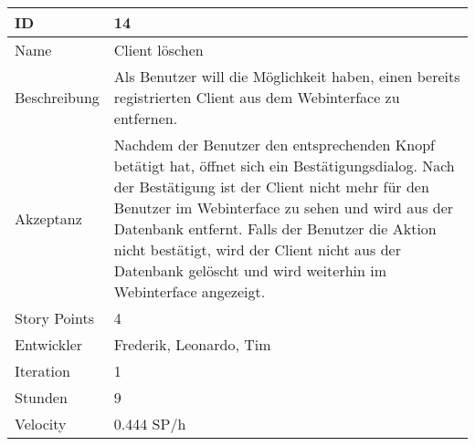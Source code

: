 \begin{table}[htbp]
    \begin{minipage}{\linewidth}
        \setlength{\tymax}{0.5\linewidth}
        \centering
        \small
        \begin{tabulary}{\textwidth}{|l|p{10cm}|} \hline
            ID   &14\\\hline
            Name  &Client löschen\\\hline
		Beschreibung&Als Benutzer will die Möglichkeit haben, einen bereits registrierten Client aus dem Webinterface zu entfernen.\\\hline
	    Akzeptanz &Nachdem der Benutzer den entsprechenden Knopf betätigt hat, öffnet sich ein Bestätigungsdialog. Nach der Bestätigung ist der Client nicht mehr für den Benutzer im Webinterface zu sehen und wird aus der Datenbank entfernt. Falls der Benutzer die Aktion nicht bestätigt, wird der Client nicht aus der Datenbank gelöscht und wird weiterhin im Webinterface angezeigt.\\\hline
            Story Points&4\\\hline
            Entwickler &Frederik, Leonardo, Tim\\\hline
            Iteration &1\\\hline
            Stunden  &9\\\hline
            Velocity &0.444 SP\slash h\\\hline
        \end{tabulary}
    \end{minipage}
\end{table}



